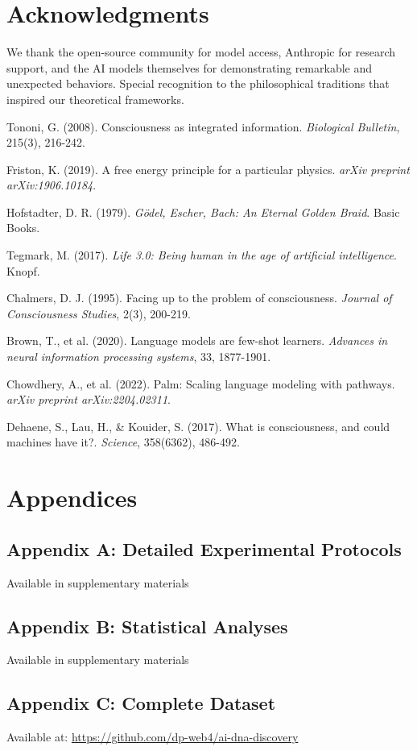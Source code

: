 \documentclass[11pt,a4paper]{article}
\begin{document}
\section*{Acknowledgments}

We thank the open-source community for model access, Anthropic for research support, and the AI models themselves for demonstrating remarkable and unexpected behaviors. Special recognition to the philosophical traditions that inspired our theoretical frameworks.

\begin{thebibliography}{99}
Tononi, G. (2008). Consciousness as integrated information. \textit{Biological Bulletin}, 215(3), 216-242.

Friston, K. (2019). A free energy principle for a particular physics. \textit{arXiv preprint arXiv:1906.10184}.

Hofstadter, D. R. (1979). \textit{Gödel, Escher, Bach: An Eternal Golden Braid}. Basic Books.

Tegmark, M. (2017). \textit{Life 3.0: Being human in the age of artificial intelligence}. Knopf.

Chalmers, D. J. (1995). Facing up to the problem of consciousness. \textit{Journal of Consciousness Studies}, 2(3), 200-219.

Brown, T., et al. (2020). Language models are few-shot learners. \textit{Advances in neural information processing systems}, 33, 1877-1901.

Chowdhery, A., et al. (2022). Palm: Scaling language modeling with pathways. \textit{arXiv preprint arXiv:2204.02311}.

Dehaene, S., Lau, H., \& Kouider, S. (2017). What is consciousness, and could machines have it?. \textit{Science}, 358(6362), 486-492.
\end{thebibliography}

\section*{Appendices}

\subsection*{Appendix A: Detailed Experimental Protocols}
Available in supplementary materials

\subsection*{Appendix B: Statistical Analyses}
Available in supplementary materials

\subsection*{Appendix C: Complete Dataset}
Available at: \url{https://github.com/dp-web4/ai-dna-discovery}
\end{document}
